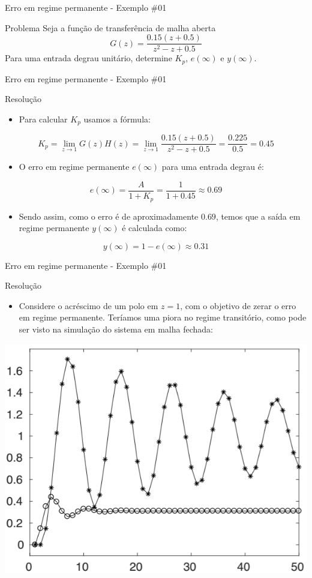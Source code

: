 \begin{frame}{Erro em regime permanente - Exemplo \#01}
\begin{block}{Problema}
Seja a função de transferência de malha aberta
$$G(z) = \dfrac{\num{0,15}(z+\num{0,5})}{z^2-z+\num{0,5}}$$
Para uma entrada degrau unitário, determine $K_p$, $e(\infty)$ e $y(\infty)$.
\end{block}
\end{frame}

\begin{frame}{Erro em regime permanente - Exemplo \#01}
\begin{block}{Resolução}
\begin{itemize}
    \item Para calcular $K_p$ usamos a fórmula:
\end{itemize}
$$K_p=\lim\limits_{z\to1} G(z)H(z) = \lim\limits_{z\to1}  \dfrac{\num{0,15}(z+\num{0,5})}{z^2-z+\num{0,5}} = \dfrac{\num{0,225}}{\num{0,5}} = \num{0,45}$$
\begin{itemize}
    \item O erro em regime permanente $e(\infty)$ para uma entrada degrau é:
\end{itemize}
$$e(\infty) = \dfrac{A}{1+K_p} = \dfrac{1}{1+\num{0,45}} \approx \num{0,69}$$
\begin{itemize}
    \item Sendo assim, como o erro é de aproximadamente $\num{0,69}$, temos que a saída em regime permanente $y(\infty)$ é calculada como:
\end{itemize}
$$y(\infty) = 1 - e(\infty) \approx \num{0,31}$$
\end{block}
\end{frame}

\begin{frame}{Erro em regime permanente - Exemplo \#01}
\begin{block}{Resolução}
\begin{itemize}
    \item Considere o acréscimo de um polo em $z=1$, com o objetivo de zerar o erro em regime permanente. Teríamos uma piora no regime transitório, como pode ser visto na simulação do sistema em malha fechada:
\end{itemize}
\end{block}
\centerline{\includegraphics[width=0.6\linewidth]{Figuras/Ch06/fig2.PNG}}
\end{frame}

